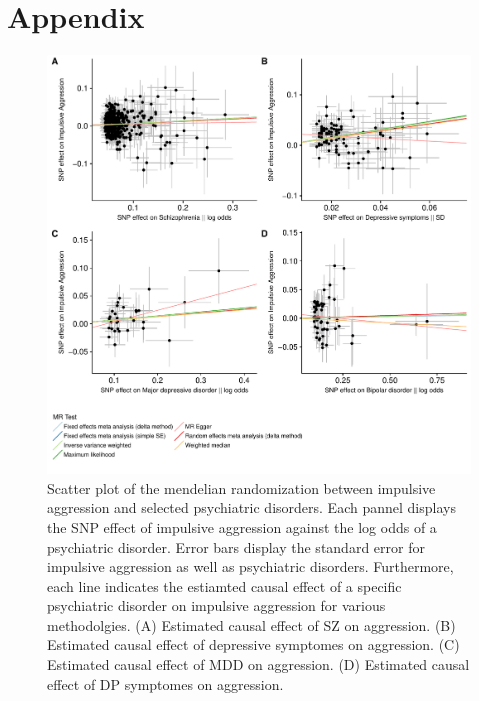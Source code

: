 \section{Appendix}
\label{sec:appendix}

\begin{figure}[htpb]
  \centering
  \includegraphics[width=0.8\linewidth]{./figures/mr_aggression.pdf}
  \caption{
    Scatter plot of the mendelian randomization between impulsive aggression and selected psychiatric disorders.
    Each pannel displays the SNP effect of impulsive aggression against the log odds of a psychiatric disorder.
    Error bars display the standard error for impulsive aggression as well as psychiatric disorders.
    Furthermore, each line indicates the estiamted causal effect of a specific psychiatric disorder on impulsive aggression for various methodolgies.
    (A) Estimated causal effect of SZ on aggression.
    (B) Estimated causal effect of depressive symptomes on aggression.
    (C) Estimated causal effect of MDD on aggression.
    (D) Estimated causal effect of DP symptomes on aggression.
  }\label{fig:mr_aggression}
\end{figure}

